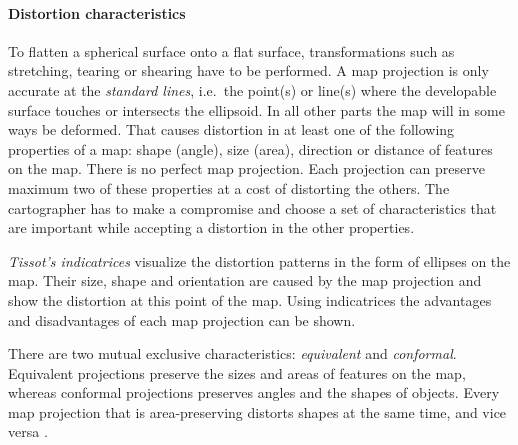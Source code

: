 

\paragraph{Distortion characteristics} %
\label{par:distortion_characteristics}

To flatten a spherical surface onto a flat surface, transformations such as stretching, tearing or shearing have to be performed. %
A map projection is only accurate at the \emph{standard lines}, i.e.\ the point(s) or line(s) where the developable surface touches or intersects the ellipsoid. In all other parts the map will in some ways be deformed. That causes distortion in at least one of the following properties of a map: shape (angle), size (area),  direction or distance of features on the map. There is no perfect map projection. Each projection can preserve maximum two of these properties at a cost of distorting the others. The cartographer has to make a compromise and choose a set of characteristics that are important while accepting a distortion in the other properties.

\emph{Tissot's indicatrices} visualize the distortion patterns in the form of ellipses on the map. Their size, shape and orientation are caused by the map projection and show the distortion at this point of the map. Using indicatrices the advantages and disadvantages of each map projection can be shown.

There are two mutual exclusive characteristics: \emph{equivalent} and \emph{conformal}. Equivalent projections preserve the sizes and areas of features on the map, whereas conformal projections preserves angles and the shapes of objects. Every map projection that is area-preserving distorts shapes at the same time, and vice versa
\cite{mapProjectionGeokov}.

